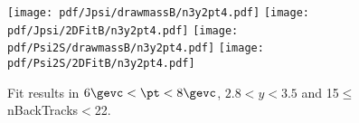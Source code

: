 \begin{figure}[H]
\begin{center}
\texttt{[image: pdf/Jpsi/drawmassB/n3y2pt4.pdf]}
\texttt{[image: pdf/Jpsi/2DFitB/n3y2pt4.pdf]}
\vspace*{-0.5cm}
\texttt{[image: pdf/Psi2S/drawmassB/n3y2pt4.pdf]}
\texttt{[image: pdf/Psi2S/2DFitB/n3y2pt4.pdf]}
\vspace*{-0.5cm}
\end{center}
\caption{Fit results in $6\gevc<\pt<8\gevc$, $2.8<y<3.5$ and 15$\leq$nBackTracks$<$22.}
\label{Fitn3y2pt4}
\end{figure}
